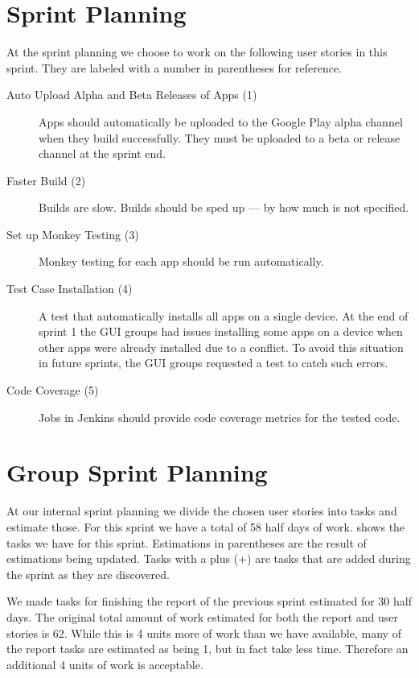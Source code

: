 \section{\bdtitle Sprint Planning}\label{sec:S2_bd}
At the \bd sprint planning we choose to work on the following user stories in this sprint. They are labeled with a number in parentheses for reference.

\begin{description}
  \item[Auto Upload Alpha and Beta Releases of Apps (1)] Apps should automatically be uploaded to the Google Play alpha channel when they build successfully. They must be uploaded to a beta or release channel at the sprint end.
  \item[Faster Build (2)] Builds are slow. Builds should be sped up --- by how much is not specified.
  \item[Set up Monkey Testing (3)] Monkey testing for each app should be run automatically.
  \item[Test Case Installation (4)] A test that automatically installs all apps on a single device. At the end of sprint 1 the GUI groups had issues installing some apps on a device when other apps were already installed due to a conflict. To avoid this situation in future sprints, the GUI groups requested a test to catch such errors.
  \item[Code Coverage (5)] Jobs in Jenkins should provide code coverage metrics for the tested code.
\end{description}

\section{Group Sprint Planning}\label{sec:S2_group}
At our internal sprint planning we divide the chosen user stories into tasks and estimate those. For this sprint we have a total of 58 half days of work.  shows the tasks we have for this sprint. Estimations in parentheses are the result of estimations being updated. Tasks with a plus (+) are tasks that are added during the sprint as they are discovered.

We made tasks for finishing the report of the previous sprint estimated for 30 half days. The original total amount of work estimated for both the report and user stories is 62. While this is 4 units more of work than we have available, many of the report tasks are estimated as being 1, but in fact take less time. Therefore an additional 4 units of work is acceptable.


